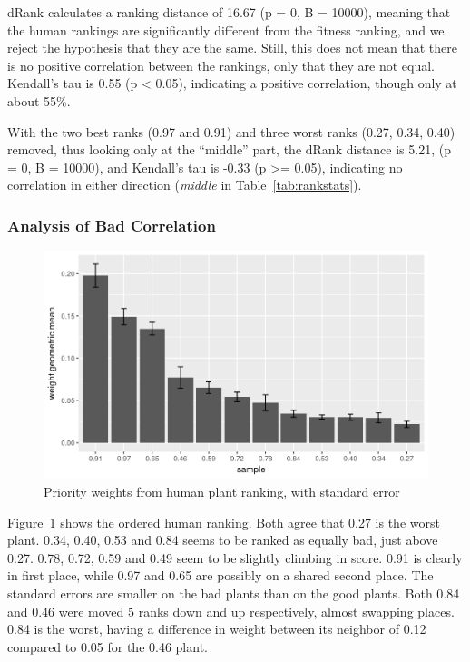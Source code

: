 dRank calculates a ranking distance of 16.67 (p = 0, B = 10000), meaning that the human rankings are significantly different from the fitness ranking, and we reject the hypothesis that they are the same.
Still, this does not mean that there is no positive correlation between the rankings, only that they are not equal.
Kendall's tau is 0.55 (p < 0.05), indicating a positive correlation, though only at about 55\%.

With the two best ranks (0.97 and 0.91) and three worst ranks (0.27, 0.34, 0.40) removed, thus looking only at the ``middle'' part, the dRank distance is 5.21, (p = 0, B = 10000), and Kendall's tau is -0.33 (p >= 0.05), indicating no correlation in either direction (\textit{middle} in Table~\ref{tab:rankstats}).

\subsubsection{Analysis of Bad Correlation}
\begin{figure}
    \centering
    \includegraphics[width=1.0\textwidth]{figures/weights_bar}
    \caption[Priority weights from human plant ranking]{Priority weights from human plant ranking, with standard error}
    \label{fig:weights-bar}
\end{figure}

Figure~\ref{fig:weights-bar} shows the ordered human ranking.
Both agree that 0.27 is the worst plant.
0.34, 0.40, 0.53 and 0.84 seems to be ranked as equally bad, just above 0.27.
0.78, 0.72, 0.59 and 0.49 seem to be slightly climbing in score.
0.91 is clearly in first place, while 0.97 and 0.65 are possibly on a shared second place.
The standard errors are smaller on the bad plants than on the good plants.
Both 0.84 and 0.46 were moved 5 ranks down and up respectively, almost swapping places.
0.84 is the worst, having a difference in weight between its neighbor of 0.12 compared to 0.05 for the 0.46 plant.

